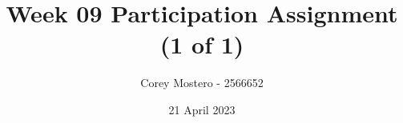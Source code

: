 \documentclass{article}
\title{Week 09 Participation Assignment (1 of 1)}
\date{21 April 2023}
\author{Corey Mostero - 2566652}
\begin{document}
\newcommand{\hr}{\par\noindent\rule{\textwidth}{0.4pt}}

\newcommand{\bc}[1]{
	\begin{equation*}
		\begin{boxed}
			{#1}
		\end{boxed}
	\end{equation*}
}

\newcommand{\cond}[2]{
	\ifmmode
		{#1} \quad {#2}
	\else
		$$ {#1} \quad {#2} $$
	\fi
}

\maketitle
\newpage

\tableofcontents
\end{document}
